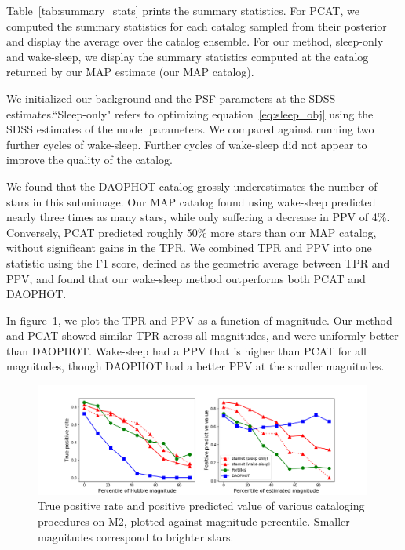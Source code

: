 Table~\ref{tab:summary_stats} prints the summary statistics. For PCAT, we 
computed the summary statistics for each catalog sampled from their posterior and display the average over the catalog ensemble. For our method, sleep-only and wake-sleep, we display the 
summary statistics computed at the catalog returned by our MAP estimate (our MAP catalog). 

We initialized our background and the PSF parameters at the SDSS estimates.``Sleep-only" refers 
to optimizing equation~\eqref{eq:sleep_obj} using the SDSS estimates of the model parameters. We compared against running two further cycles of wake-sleep. Further cycles of wake-sleep did not appear to improve the quality of the catalog. 

We found that the DAOPHOT catalog grossly underestimates the number of stars in this submimage.
Our MAP catalog found using wake-sleep predicted nearly three times as many stars, while only suffering a decrease in PPV of 4\%. 
Conversely, PCAT predicted roughly 50\% more stars than our MAP catalog, without significant gains in the TPR. 
We combined TPR and PPV into one statistic using the F1 score,
defined as the geometric average between TPR and PPV, and found that our wake-sleep method outperforms both PCAT and DAOPHOT.



In figure~\ref{fig:summary_stats}, we plot the TPR and PPV as a function of magnitude.
Our method and PCAT showed similar TPR across all magnitudes, and were
uniformly better than DAOPHOT. Wake-sleep had a PPV that is higher than PCAT for all magnitudes, though DAOPHOT had a better PPV at the smaller magnitudes.

\begin{figure}[h]
    \centering
    \includegraphics[width=0.99\textwidth]{figures/summary_statistics_m2.png}
    \caption{True positive rate and positive predicted value of various cataloging
    procedures on M2, plotted against magnitude percentile.
    Smaller magnitudes correspond to brighter stars. }
    \label{fig:summary_stats}
\end{figure}

